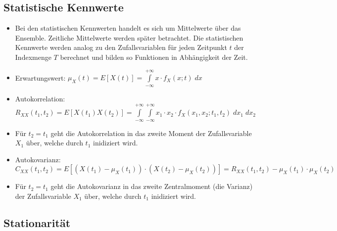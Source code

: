 \documentclass[10pt, a4paper]{article}
\begin{document}
\subsection{Statistische Kennwerte}
\begin{itemize}
  \item Bei den statistischen Kennwerten handelt es sich um Mittelwerte \"uber das Ensemble. 
        Zeitliche Mittelwerte werden sp\"ater betrachtet. Die statistischen Kennwerte werden
        analog zu den Zufallsvariablen 
        f\"ur jeden Zeitpunkt $t$ der Indexmenge $T$ berechnet
        und bilden so Funktionen in Abh\"angigkeit der Zeit.
  \item Erwartungswert:
        $\mu_{X}(t) = E\left[X(t)\right] =
          \int\limits_{-\infty}^{+\infty} x \cdot f_{X}(x;t)\;dx$
  \item Autokorrelation:
        $R_{XX}(t_{1},t_{2}) = E\left[X(t_{1})X(t_{2})\right] =
          \int\limits_{-\infty}^{+\infty} \int\limits_{-\infty}^{+\infty} 
            x_{1} \cdot  x_{2}\cdot f_{X}(x_{1},x_{2};t_{1},t_{2})\;dx_{1} \;dx_{2}$
  \item F\"ur $t_{2} = t_{1}$ geht die Autokorrelation in das zweite Moment der Zufallsvariable
        $X_{1}$ \"uber, welche durch $t_{1}$ inidiziert wird.
  \item Autokovarianz: \\
        $C_{XX}(t_{1},t_{2}) =
          E\left[ \left( X(t_{1})-\mu_{X}(t_{1})\right) \cdot
                  \left( X(t_{2})-\mu_{X}(t_{2})\right) \right] =
          R_{XX}(t_{1},t_{2}) - \mu_{X}(t_{1}) \cdot \mu_{X}(t_{2})$
  \item F\"ur $t_{2} = t_{1}$ geht die Autokovarianz in das zweite Zentralmoment (die Varianz)
        der Zufallsvariable $X_{1}$ \"uber, welche durch $t_{1}$ inidiziert wird.
\end{itemize} 

\subsection{Stationarit\"at}
\end{document}
